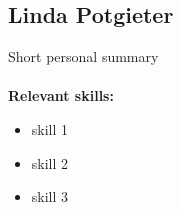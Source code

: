 \documentclass[12pt,a4paper]{article}
\begin{document}
		
		\subsection{Linda Potgieter}
		Short personal summary\\\\
		\textbf{\small Relevant skills:}
		\begin{itemize}
			\item skill 1
			\item skill 2
			\item skill 3
		\end{itemize}
\end{document}
